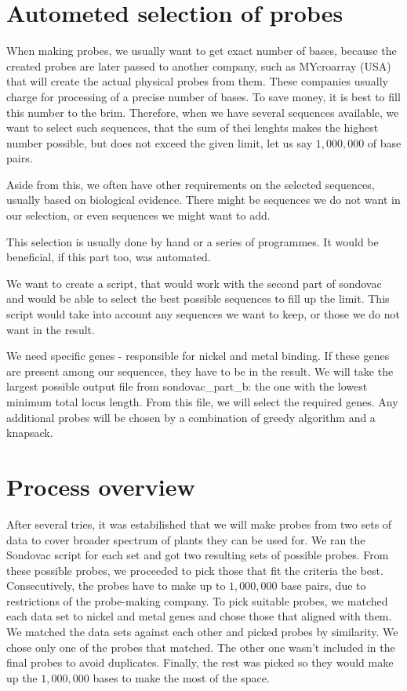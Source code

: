 \section{Autometed selection of probes}

When making probes, we usually want to get exact number of bases, because the created probes are later passed to another 
company, such as MYcroarray (USA) \cite{mycroarray} that will create the actual physical probes from them. These companies 
usually charge for processing of a precise number of bases. To save money, it is best to fill this number to the brim. 
Therefore, when we have several sequences available, we want to select such sequences, that the sum of thei lenghts makes the 
highest number possible, but does not exceed the given limit, let us say $1,000,000$ of base pairs. 

Aside from this, we often have other requirements on the selected sequences, usually based on biological evidence. There might be 
sequences we do not want in our selection, or even sequences we might want to add. 

This selection is usually done by hand or a series of programmes. It would be beneficial, if this part too, was automated. 

We want to create a script, that would work with the second part of sondovac and would be able to select the best possible 
sequences to fill up the limit. This script would take into account any sequences we want to keep, or those we do not want in 
the result. 

We need specific genes - responsible for nickel and metal binding. If these genes are present among our sequences, they have 
to be in the result. We will take the largest possible output file from sondovac\_part\_b: the one with the lowest minimum total locus length. 
From this file, we will select the required genes. Any additional probes will be chosen by a combination of greedy algorithm and a knapsack. 


\section{Process overview}
After several tries, it was estabilished that we will make probes from two sets of data to cover broader spectrum of plants they can 
be used for. We ran the Sondovac script for each set and got two resulting sets of possible probes. From these possible probes, we 
proceeded to pick those that fit the criteria the best. Consecutively, the probes have to make up to $1,000,000$ base pairs, due to 
restrictions of the probe-making company. 
To pick suitable probes, we matched each data set to nickel and metal genes and chose those that aligned with them. We matched the 
data sets against each other and picked probes by similarity. We chose only one of the probes that matched. The other one 
wasn't included in the final probes to avoid duplicates. Finally, the rest was picked so they would make up the $1,000,000$ bases to 
make the most of the space. 

